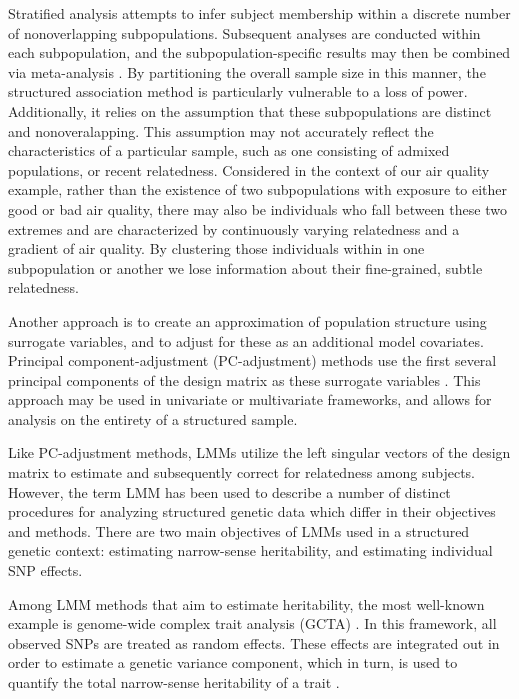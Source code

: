 Stratified analysis attempts to infer subject membership within a discrete number of nonoverlapping subpopulations. Subsequent analyses are conducted within each subpopulation, and the subpopulation-specific results may then be combined via meta-analysis \cite{pritchard1999use, pritchard2000association}. By partitioning the overall sample size in this manner, the structured association method is particularly vulnerable to a loss of power. Additionally, it relies on the assumption that these subpopulations are distinct and nonoveralapping. This assumption may not accurately reflect the characteristics of a particular sample, such as one consisting of admixed populations, or recent relatedness. Considered in the context of our air quality example, rather than the existence of two subpopulations with exposure to either good or bad air quality, there may also be individuals who fall between these two extremes and are characterized by continuously varying relatedness and a gradient of air quality. By clustering those individuals within in one subpopulation or another we lose information about their fine-grained, subtle relatedness.

Another approach is to create an approximation of population structure using surrogate variables, and to adjust for these as an additional model covariates. Principal component-adjustment (PC-adjustment) methods use the first several principal components of the design matrix as these surrogate variables \cite{price2006principal}. This approach may be used in univariate or multivariate frameworks, and allows for analysis on the entirety of a structured sample. 

Like PC-adjustment methods, LMMs utilize the left singular vectors of the design matrix to estimate and subsequently correct for relatedness among subjects. However, the term LMM has been used to describe a number of distinct procedures for analyzing structured genetic data which differ in their objectives and methods. There are two main objectives of LMMs used in a structured genetic context: estimating narrow-sense heritability, and estimating individual SNP effects.

Among LMM methods that aim to estimate heritability, the most well-known example is genome-wide complex trait analysis (GCTA) \cite{yang2011gcta}. In this framework, all observed SNPs are treated as random effects. These effects are integrated out in order to estimate a genetic variance component, which in turn, is used to quantify the total narrow-sense heritability of a trait \cite{yang2010common}.

